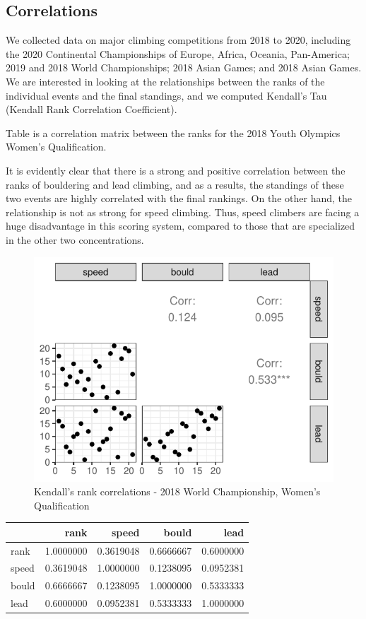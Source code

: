 \documentclass[
  11pt,
]{article}
\begin{document}
\hypertarget{correlations}{%
\subsection{Correlations}\label{correlations}}

We collected data on major climbing competitions from 2018 to 2020,
including the 2020 Continental Championships of Europe, Africa, Oceania,
Pan-America; 2019 and 2018 World Championships; 2018 Asian Games; and
2018 Asian Games. We are interested in looking at the relationships
between the ranks of the individual events and the final standings, and
we computed Kendall's Tau (Kendall Rank Correlation Coefficient).

Table is a correlation matrix between the ranks for the 2018 Youth
Olympics Women's Qualification.

It is evidently clear that there is a strong and positive correlation
between the ranks of bouldering and lead climbing, and as a results, the
standings of these two events are highly correlated with the final
rankings. On the other hand, the relationship is not as strong for speed
climbing. Thus, speed climbers are facing a huge disadvantage in this
scoring system, compared to those that are specialized in the other two
concentrations.

\begin{figure}
\centering
\includegraphics{draft_files/figure-latex/unnamed-chunk-7-1.pdf}
\caption{Kendall's rank correlations - 2018 World Championship, Women's
Qualification}
\end{figure}

\begin{longtable}[]{@{}lrrrr@{}}
\toprule
& rank & speed & bould & lead \\
\midrule
\endhead
rank & 1.0000000 & 0.3619048 & 0.6666667 & 0.6000000 \\
speed & 0.3619048 & 1.0000000 & 0.1238095 & 0.0952381 \\
bould & 0.6666667 & 0.1238095 & 1.0000000 & 0.5333333 \\
lead & 0.6000000 & 0.0952381 & 0.5333333 & 1.0000000 \\
\bottomrule
\end{longtable}
\end{document}
